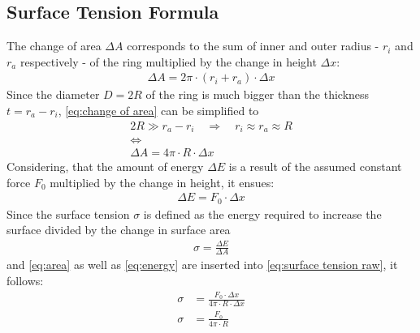         \subsection{Surface Tension Formula}\label{sec:A2 derive eq.4}%
            The change of area $ \Delta A $ corresponds to the sum of inner and outer radius - $ r_i $ and $ r_a $ respectively - of
            the ring multiplied by the change in height $ \Delta x $:
            \begin{align}
                \Delta A = 2\pi \cdot (r_i + r_a) \cdot \Delta x
                \label{eq:change of area}
            \end{align}
            Since the diameter $ D = 2R $ of the ring is much bigger than the thickness $ t = r_a - r_i $, \cref{eq:change of area}
            can be simplified to
            \begin{equation}
                \begin{gathered}
                    2R \gg r_a-r_i \quad \Rightarrow \quad r_i \approx r_a \approx R \\
                    \Leftrightarrow \\
                    \Delta A = 4\pi \cdot R \cdot \Delta x
                    \label{eq:area}
                \end{gathered}
            \end{equation}
            Considering, that the amount of energy $ \Delta E $ is a result of the assumed constant force $ F_0 $ multiplied
            by the change in height, it ensues:
            \begin{align}
                \Delta E = F_0 \cdot \Delta x
                \label{eq:energy}
            \end{align}
            Since the surface tension $ \sigma $ is defined as the energy required to increase the surface divided by the change in surface area
            \begin{align}
                \sigma = \frac{\Delta E}{\Delta A}
                \label{eq:surface tension raw}
            \end{align}
            and \cref{eq:area} as well as \cref{eq:energy} are inserted into \cref{eq:surface tension raw}, it follows:
            \begin{align}
                \sigma &= \frac{F_0 \cdot \Delta x}{4\pi \cdot R \cdot \Delta x} \nonumber\\
                \sigma &= \frac{F_0}{4\pi \cdot R}
                \label{eq:surface tension}
            \end{align}
